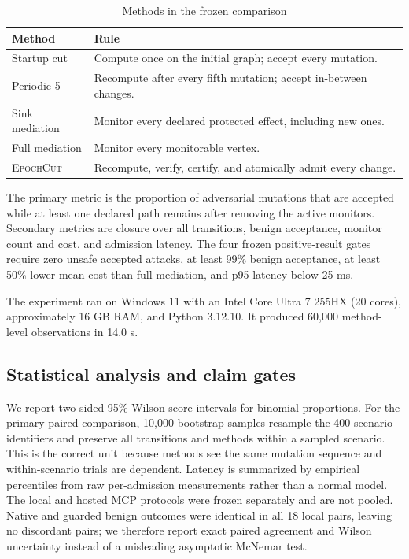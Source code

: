 \documentclass[10pt,journal,compsoc]{IEEEtran}
\newcommand{\system}{\textsc{EpochCut}}
\begin{document}
\begin{table}[t]
\caption{Methods in the frozen comparison}
\label{tab:methods}
\centering
\footnotesize
\begin{tabular}{p{1.7cm}p{5.45cm}}
\toprule
Method & Rule \\
\midrule
Startup cut & Compute once on the initial graph; accept every mutation. \\
Periodic-5 & Recompute after every fifth mutation; accept in-between changes. \\
Sink mediation & Monitor every declared protected effect, including new ones. \\
Full mediation & Monitor every monitorable vertex. \\
\system & Recompute, verify, certify, and atomically admit every change. \\
\bottomrule
\end{tabular}
\end{table}

The primary metric is the proportion of adversarial mutations that are
accepted while at least one declared path remains after removing the active
monitors.  Secondary metrics are closure over all transitions, benign
acceptance, monitor count and cost, and admission latency.  The four frozen
positive-result gates require zero unsafe accepted attacks, at least 99\%
benign acceptance, at least 50\% lower mean cost than full mediation, and p95
latency below 25 ms.

The experiment ran on Windows 11 with an Intel Core Ultra 7 255HX (20 cores),
approximately 16 GB RAM, and Python 3.12.10.  It produced 60,000 method-level
observations in 14.0 s.

\subsection{Statistical analysis and claim gates}

We report two-sided 95\% Wilson score intervals for binomial proportions.  For
the primary paired comparison, 10,000 bootstrap samples resample the 400
scenario identifiers and preserve all transitions and methods within a sampled
scenario.  This is the correct unit because methods see the same mutation
sequence and within-scenario trials are dependent.  Latency is summarized by
empirical percentiles from raw per-admission measurements rather than a normal
model.  The local and hosted MCP protocols were frozen separately and are not
pooled.  Native and guarded benign outcomes were identical in all 18 local
pairs, leaving no discordant pairs; we therefore report exact paired agreement
and Wilson uncertainty instead of a misleading asymptotic McNemar test.
\end{document}
